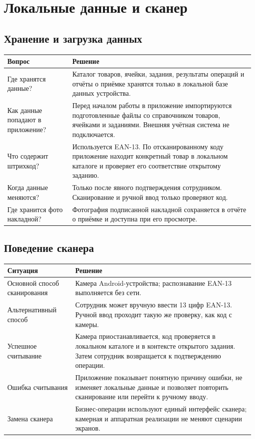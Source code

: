 \section{Локальные данные и сканер}

\subsection{Хранение и загрузка данных}

\begin{tabularx}{\textwidth}{L{48mm}Y}
\toprule
\textbf{Вопрос} & \textbf{Решение} \\
\midrule
Где хранятся данные? & Каталог товаров, ячейки, задания, результаты операций и отчёты о приёмке хранятся только в локальной базе данных устройства. \\
Как данные попадают в приложение? & Перед началом работы в приложение импортируются подготовленные файлы со справочником товаров, ячейками и заданиями. Внешняя учётная система не подключается. \\
Что содержит штрихкод? & Используется EAN-13. По отсканированному коду приложение находит конкретный товар в локальном каталоге и проверяет его соответствие открытому заданию. \\
Когда данные меняются? & Только после явного подтверждения сотрудником. Сканирование и ручной ввод только проверяют код. \\
Где хранится фото накладной? & Фотография подписанной накладной сохраняется в отчёте о приёмке и доступна при его просмотре. \\
\bottomrule
\end{tabularx}

\subsection{Поведение сканера}

\begin{tabularx}{\textwidth}{L{48mm}Y}
\toprule
\textbf{Ситуация} & \textbf{Решение} \\
\midrule
Основной способ сканирования & Камера Android-устройства; распознавание EAN-13 выполняется без сети. \\
Альтернативный способ & Сотрудник может вручную ввести 13 цифр EAN-13. Ручной ввод проходит такую же проверку, как код с камеры. \\
Успешное считывание & Камера приостанавливается, код проверяется в локальном каталоге и в контексте открытого задания. Затем сотрудник возвращается к подтверждению операции. \\
Ошибка считывания & Приложение показывает понятную причину ошибки, не изменяет локальные данные и позволяет повторить сканирование или перейти к ручному вводу. \\
Замена сканера & Бизнес-операции используют единый интерфейс сканера; камерная и аппаратная реализации не меняют сценарии экранов. \\
\bottomrule
\end{tabularx}
